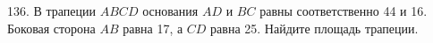 136. В трапеции $ABCD$ основания $AD$ и $BC$ равны соответственно 44 и 16. Боковая сторона $AB$ равна 17, а $CD$ равна 25. Найдите площадь трапеции.\\
